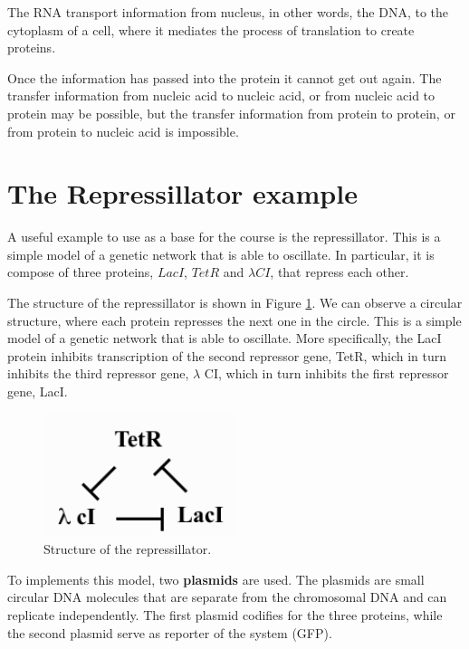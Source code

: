 The RNA transport information from nucleus, in other words, the DNA, to the
cytoplasm of a cell, where it mediates the process of translation to create proteins.

Once the information has passed into the protein it cannot get out again. The
transfer information from nucleic acid to nucleic acid, or from nucleic acid to
protein may be possible, but the transfer information from protein to protein,
or from protein to nucleic acid is impossible.
\section*{The Repressillator example}
A useful example to use as a base for the course is the repressillator. This is a
simple model of a genetic network that is able to oscillate. In particular, it is
compose of three proteins, $LacI$, $TetR$ and $\lambda CI$, that repress each other.

The structure of the repressillator is shown in Figure \ref{fig:repressillator}.
We can observe a circular structure, where each protein represses the next one in
the circle. This is a simple model of a genetic network that is able to oscillate.
More specifically, the LacI protein inhibits transcription of the second repressor
gene, TetR, which in turn inhibits the third repressor gene, $\lambda$ CI, which
in turn inhibits the first repressor gene, LacI.
\begin{figure}[!ht]
    \centering
    \includegraphics[width=0.5\textwidth]{img/repressillator.png}
    \caption{Structure of the repressillator.}
    \label{fig:repressillator}
\end{figure}

To implements this model, two \textbf{plasmids} are used. The plasmids are small
circular DNA molecules that are separate from the chromosomal DNA and can replicate
independently. The first plasmid codifies for the three proteins, while the second
plasmid serve as reporter of the system (GFP).

